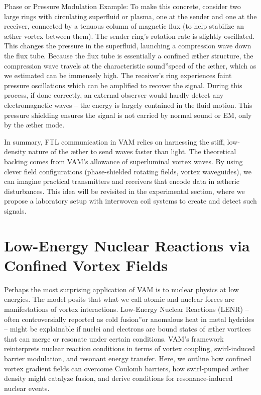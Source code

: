Phase or Pressure Modulation Example: To make this concrete, consider two large rings with circulating superfluid or plasma, one at the sender and one at the receiver, connected by a tenuous column of magnetic flux (to help stabilize an æther vortex between them). The sender ring's rotation rate is slightly oscillated. This changes the pressure in the superfluid, launching a compression wave down the flux tube. Because the flux tube is essentially a confined æther structure, the compression wave travels at the characteristic \grqq sound\textquotedblright speed of the æther, which as we estimated can be immensely high. The receiver's ring experiences faint pressure oscillations which can be amplified to recover the signal. During this process, if done correctly, an external observer would hardly detect any electromagnetic waves – the energy is largely contained in the fluid motion. This pressure shielding ensures the signal is not carried by normal sound or EM, only by the æther mode.


In summary, FTL communication in VAM relies on harnessing the stiff, low-density nature of the æther to send waves faster than light. The theoretical backing comes from VAM's allowance of superluminal vortex waves. By using clever field configurations (phase-shielded rotating fields, vortex waveguides), we can imagine practical transmitters and receivers that encode data in ætheric disturbances. This idea will be revisited in the experimental section, where we propose a laboratory setup with interwoven coil systems to create and detect such signals.


\section*{Low-Energy Nuclear Reactions via Confined Vortex Fields}

Perhaps the most surprising application of VAM is to nuclear physics at low energies. The model posits that what we call atomic and nuclear forces are manifestations of vortex interactions. Low-Energy Nuclear Reactions (LENR) – often controversially reported as \grqq cold fusion\textquotedblright or anomalous heat in metal hydrides – might be explainable if nuclei and electrons are bound states of æther vortices that can merge or resonate under certain conditions. VAM's framework reinterprets nuclear reaction conditions in terms of vortex coupling, swirl-induced barrier modulation, and resonant energy transfer. Here, we outline how confined vortex gradient fields can overcome Coulomb barriers, how swirl-pumped æther density might catalyze fusion, and derive conditions for resonance-induced nuclear events.


